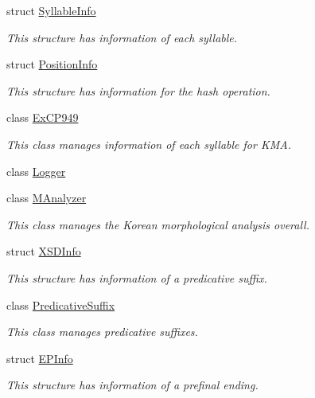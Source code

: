 \begin{CompactItemize}
struct \hyperlink{structkmaOrange_1_1SyllableInfo}{SyllableInfo}
\begin{CompactList}\small\item\em This structure has information of each syllable. \item\end{CompactList}\item 
struct \hyperlink{structkmaOrange_1_1PositionInfo}{PositionInfo}
\begin{CompactList}\small\item\em This structure has information for the hash operation. \item\end{CompactList}\item 
class \hyperlink{classkmaOrange_1_1ExCP949}{ExCP949}
\begin{CompactList}\small\item\em This class manages information of each syllable for KMA. \item\end{CompactList}\item 
class \hyperlink{classkmaOrange_1_1Logger}{Logger}
\item 
class \hyperlink{classkmaOrange_1_1MAnalyzer}{MAnalyzer}
\begin{CompactList}\small\item\em This class manages the Korean morphological analysis overall. \item\end{CompactList}\item 
struct \hyperlink{structkmaOrange_1_1XSDInfo}{XSDInfo}
\begin{CompactList}\small\item\em This structure has information of a predicative suffix. \item\end{CompactList}\item 
class \hyperlink{classkmaOrange_1_1PredicativeSuffix}{PredicativeSuffix}
\begin{CompactList}\small\item\em This class manages predicative suffixes. \item\end{CompactList}\item 
struct \hyperlink{structkmaOrange_1_1EPInfo}{EPInfo}
\begin{CompactList}\small\item\em This structure has information of a prefinal ending. \item\end{CompactList}\item 

\end{CompactItemize}

